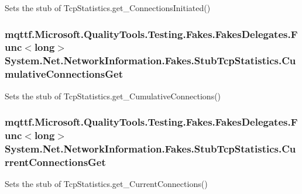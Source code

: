 Sets the stub of Tcp\-Statistics.\-get\-\_\-\-Connections\-Initiated()

\hypertarget{class_system_1_1_net_1_1_network_information_1_1_fakes_1_1_stub_tcp_statistics_af19585632f3548f77331a35713c92e38}{
\subsubsection[{Cumulative\-Connections\-Get}]{\setlength{\rightskip}{0pt plus 5cm}mqttf.\-Microsoft.\-Quality\-Tools.\-Testing.\-Fakes.\-Fakes\-Delegates.\-Func$<$long$>$ System.\-Net.\-Network\-Information.\-Fakes.\-Stub\-Tcp\-Statistics.\-Cumulative\-Connections\-Get}}\label{class_system_1_1_net_1_1_network_information_1_1_fakes_1_1_stub_tcp_statistics_af19585632f3548f77331a35713c92e38}


Sets the stub of Tcp\-Statistics.\-get\-\_\-\-Cumulative\-Connections()

\hypertarget{class_system_1_1_net_1_1_network_information_1_1_fakes_1_1_stub_tcp_statistics_a5e6b9a872f33abf16668419acc0e2c78}{
\subsubsection[{Current\-Connections\-Get}]{\setlength{\rightskip}{0pt plus 5cm}mqttf.\-Microsoft.\-Quality\-Tools.\-Testing.\-Fakes.\-Fakes\-Delegates.\-Func$<$long$>$ System.\-Net.\-Network\-Information.\-Fakes.\-Stub\-Tcp\-Statistics.\-Current\-Connections\-Get}}\label{class_system_1_1_net_1_1_network_information_1_1_fakes_1_1_stub_tcp_statistics_a5e6b9a872f33abf16668419acc0e2c78}


Sets the stub of Tcp\-Statistics.\-get\-\_\-\-Current\-Connections()

